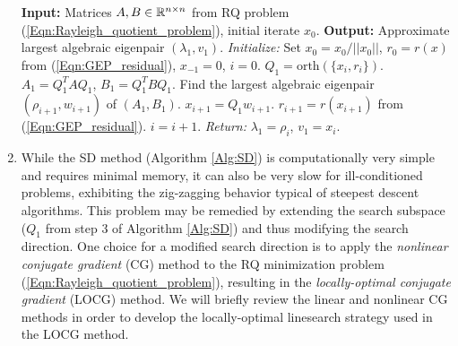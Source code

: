 \begin{enumerate}
\begin{algorithm}[H]
\begin{algorithmic}[1]
	\Statex		\textbf{Input:} Matrices $A, B \in {\mathbb R}^{n \times n}$ from RQ  problem (\ref{Eqn:Rayleigh_quotient_problem}), initial iterate $x_0$.
	\Statex 	\textbf{Output:} Approximate largest algebraic eigenpair $(\lambda_1, v_1)$.
	\State		\textit{Initialize:} Set $x_0 = x_0/||x_0||$, $r_0 = r(x)$ from (\ref{Eqn:GEP_residual}), $x_{-1} = 0$, $i = 0$.
		\State	$Q_1 = \text{orth}( \{x_i, r_i \} )$.
		\State	$A_1 = Q_1^TAQ_1$, $B_1 = Q_1^TBQ_1$.
		\State 	Find the largest algebraic eigenpair $(\rho_{i+1}, w_{i+1})$ of $(A_1, B_1)$.
		\State	$x_{i+1} = Q_1w_{i+1}$.
		\State	$r_{i+1} =r(x_{i+1})$ from (\ref{Eqn:GEP_residual}).
		\State 	$i = i + 1$.
	\EndWhile
	\State		\textit{Return:} $\lambda_1 = \rho_i$, $v_1 = x_i$.
\end{algorithmic}

\end{algorithm}



\item



While the SD method (Algorithm \ref{Alg:SD}) is computationally very simple and requires minimal memory, it can also be very slow for ill-conditioned problems, exhibiting the zig-zagging behavior typical of steepest descent algorithms.  This problem may be remedied by extending the search subspace ($Q_1$ from step 3 of Algorithm \ref{Alg:SD}) and thus modifying the search direction.  One choice for a modified search direction is to apply the \textit{nonlinear conjugate gradient} (CG) method \cite{fletcher1964function} to the RQ minimization problem (\ref{Eqn:Rayleigh_quotient_problem}), resulting in the \textit{locally-optimal conjugate gradient} (LOCG) method.  We will briefly review the linear and nonlinear CG methods in order to develop the locally-optimal linesearch strategy used in the LOCG method.




\end{enumerate}

